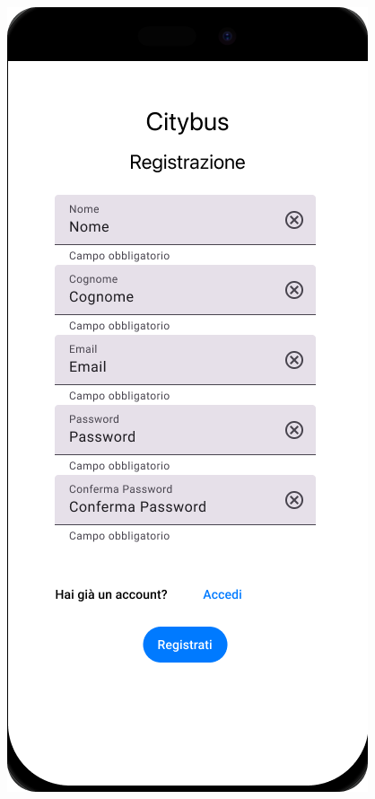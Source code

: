 \begin{figure}[H]
  \centering
  \begin{minipage}[b]{0.25\textwidth}
    \centering
    \includegraphics[width=\textwidth]{images/mockup/Registrazione.png}

\end{minipage}
\end{figure}

